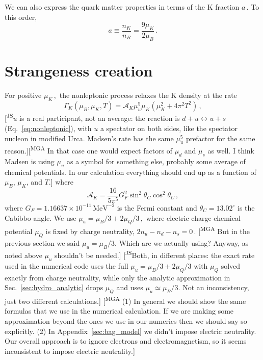 \documentclass[10pt,superscriptaddress,
amsmath,aps,prc,twocolumn,nofootinbib,floatfix]{revtex4-1}
\newcommand{\mgacom}[1]{\textsf{\color[rgb]{0.8,0,0}[\textsuperscript{MGA} #1]}}
\newcommand{\JScom}[1]{\textsf{\color{violet} [\textsuperscript{JS}#1]}}
\newcommand{\MeV}{\text{MeV}}
\begin{document}
We can also express the quark matter properties in terms of the K fraction $a\,.$
To this order,
\begin{equation}
a\equiv\dfrac{n_K}{n_B}=\dfrac{9\mu_K}{2\mu_B}\,.
\label{eq:a-muK}
\end{equation}


\section{Strangeness creation}
\label{sec:K-creation}

For positive $\mu_K\,,$ the nonleptonic process relaxes the K density at the
rate~\cite{Madsen:1993xx}
\begin{equation}
 \Gamma_K(\mu_B,\mu_K,T)
 =\mathcal A_K\mu_u^5\mu_K
 \left(\mu_K^2+4\pi^2T^2\right)\,,
\label{eq:exact_rate}
\end{equation}
\JScom{$u$ is a real participant, not an average: the reaction is $d+u\leftrightarrow u+s$ (Eq.~\eqref{eq:nonleptonic}), with $u$ a spectator on both sides, like the spectator nucleon in modified Urca. Madsen's rate has the same $\mu_u^5$ prefactor for the same reason.}\mgacom{In that case one would expect factors of $\mu_d$ and $\mu_s$ as well. I think Madsen is using $\mu_u$ as a symbol for something else, probably some average of chemical potentials. In our calculation everything should end up as a function of $\mu_B$, $\mu_K$, and $T$.}
where
\begin{equation}
 \mathcal A_K=
 \frac{16}{5\pi^5}G_F^2
 \sin^2\theta_C\cos^2\theta_C\,,
\label{eq:exact_prefactor}
\end{equation}
where $G_F=1.16637\times10^{-11}\,\MeV^{-2}$ is the Fermi constant and $\theta_C=13.02^\circ$ is the Cabibbo angle.
We use
$\mu_u=\mu_B/3+2\mu_Q/3\,,$ where electric charge chemical potential $\mu_Q$ is fixed by charge neutrality,
$2n_u-n_d-n_s=0\,.$ \mgacom{But in the previous section we said $\mu_u=\mu_B/3$. Which are we actually using? Anyway, as noted above $\mu_u$ shouldn't be needed.}
\JScom{Both, in different places: the exact rate used in the numerical code uses the full $\mu_u=\mu_B/3+2\mu_Q/3$ with $\mu_Q$ solved exactly from charge neutrality, while only the analytic approximation in Sec.~\ref{sec:hydro_analytic} drops $\mu_Q$ and uses $\mu_u\simeq\mu_B/3$.
Not an inconsistency, just two different calculations.}
\mgacom{(1) In general we should show the same formulas that we use in the numerical calculation. If we are making some approximation beyond the ones we use in our numerics then we should say so explicitly. (2) In Appendix~\ref{sec:bag_model} we didn't impose electric neutrality. Our overall approach is to ignore electrons and electromagnetism, so it seems inconsistent to impose electric neutrality.}
\end{document}
